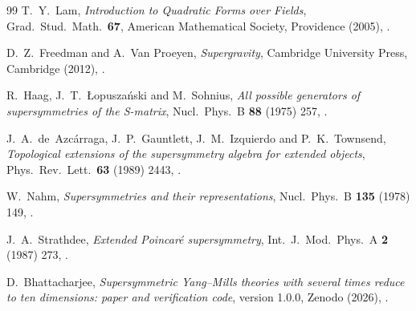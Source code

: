 \begin{thebibliography}{99}
T.~Y.~Lam, \textit{Introduction to Quadratic Forms over Fields}, Grad.\ Stud.\ Math.\ \textbf{67}, American Mathematical Society, Providence (2005), .

D.~Z.~Freedman and A.~Van Proeyen, \textit{Supergravity}, Cambridge University Press, Cambridge (2012), .

R.~Haag, J.~T.~{\L}opusza\'nski and M.~Sohnius, \textit{All possible generators of supersymmetries of the S-matrix}, Nucl.\ Phys.\ B \textbf{88} (1975) 257, .

J.~A.~de~Azc\'arraga, J.~P.~Gauntlett, J.~M.~Izquierdo and P.~K.~Townsend, \textit{Topological extensions of the supersymmetry algebra for extended objects}, Phys.\ Rev.\ Lett.\ \textbf{63} (1989) 2443, .

W.~Nahm, \textit{Supersymmetries and their representations}, Nucl.\ Phys.\ B \textbf{135} (1978) 149, .

J.~A.~Strathdee, \textit{Extended Poincar\'e supersymmetry}, Int.\ J.\ Mod.\ Phys.\ A \textbf{2} (1987) 273, .

D.~Bhattacharjee, \textit{Supersymmetric Yang--Mills theories with several times reduce to ten dimensions: paper and verification code}, version 1.0.0, Zenodo (2026), .

\end{thebibliography}
